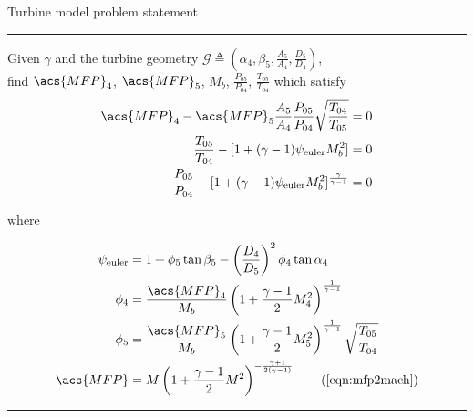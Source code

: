 \begin{table}
\centering
\caption{Turbine model problem statement}
\label{map:turbine}
\begin{minipage}{0.7\textwidth}
    \hrule

    Given $\gamma$ and the turbine geometry 
    $\mathcal{G} \triangleq \left(
    \alpha_4, \beta_5, \tfrac{A_5}{A_4}, \tfrac{D_{5}}{D_4} \right)$, \\
    find $\acs{MFP}_4$, $\acs{MFP}_5$, $M_b$, $\frac{P_{05}}{P_{04}}$, $\frac{T_{05}}{T_{04}}$ 
    which satisfy
\begin{align}
    \acs{MFP}_4 - \acs{MFP}_5\frac{A_5}{A_4}\frac{P_{05}}{P_{04}}\sqrt{\frac{T_{04}}{T_{05}}}    &= 0 \\
    \frac{T_{05}}{T_{04}} - [1 + (\gamma-1)\psi_{\text{euler}} M_b^2]                           &= 0 \\
    \frac{P_{05}}{P_{04}} - [1 + (\gamma-1)\psi_{\text{euler}} M_b^2]^{\frac{\gamma}{\gamma-1}} &= 0 \label{eqn:turb_res_pr}
\end{align}

where

\begin{align}
    \psi_{\text{euler}} & = 1 + \phi_5\tan\beta_5-\left(\frac{D_4}{D_5}\right)^2\phi_4\tan\alpha_4 \\
    \phi_4 &= \frac{\acs{MFP}_4}{M_b} \left( 1 + \frac{\gamma-1}{2} M_4^2 \right)^{\frac{1}{\gamma-1}} \\
    \phi_5 &= \frac{\acs{MFP}_5}{M_b} \left( 1 + \frac{\gamma-1}{2} M_5^2 \right)^{\frac{1}{\gamma-1}} \sqrt{\frac{T_{05}}{T_{04}}}\\
    \acs{MFP} &= M \left( 1 + \frac{\gamma-1}{2} M^2 \right)^{-\frac{\gamma+1}{2(\gamma-1)}} \tag{\ref{eqn:mfp2mach}}
\end{align}

    \hrule
\end{minipage}
\end{table}


